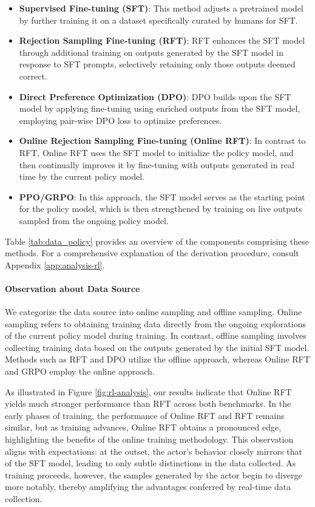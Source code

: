 \begin{itemize}[topsep=0pt]
\begin{itemize}[topsep=0pt]
\begin{itemize}
    \item \textbf{Supervised Fine-tuning (SFT)}: This method adjusts a pretrained model by further training it on a dataset specifically curated by humans for SFT.
    \item \textbf{Rejection Sampling Fine-tuning (RFT)}: RFT enhances the SFT model through additional training on outputs generated by the SFT model in response to SFT prompts, selectively retaining only those outputs deemed correct.
    \item \textbf{Direct Preference Optimization (DPO)}: DPO builds upon the SFT model by applying fine-tuning using enriched outputs from the SFT model, employing pair-wise DPO loss to optimize preferences.
    \item \textbf{Online Rejection Sampling Fine-tuning (Online RFT)}: In contrast to RFT, Online RFT uses the SFT model to initialize the policy model, and then continually improves it by fine-tuning with outputs generated in real time by the current policy model.
    \item \textbf{PPO/GRPO}: In this approach, the SFT model serves as the starting point for the policy model, which is then strengthened by training on live outputs sampled from the ongoing policy model.
\end{itemize}

Table \ref{tab:data_policy} provides an overview of the components comprising these methods. For a comprehensive explanation of the derivation procedure, consult Appendix \ref{app:analysis-rl}.

\paragraph{Observation about Data Source} We categorize the data source into online sampling and offline sampling. Online sampling refers to obtaining training data directly from the ongoing explorations of the current policy model during training. In contrast, offline sampling involves collecting training data based on the outputs generated by the initial SFT model. Methods such as RFT and DPO utilize the offline approach, whereas Online RFT and GRPO employ the online approach.

As illustrated in Figure \ref{fig:rl-analysis}, our results indicate that Online RFT yields much stronger performance than RFT across both benchmarks. In the early phases of training, the performance of Online RFT and RFT remains similar, but as training advances, Online RFT obtains a pronounced edge, highlighting the benefits of the online training methodology. This observation aligns with expectations: at the outset, the actor’s behavior closely mirrors that of the SFT model, leading to only subtle distinctions in the data collected. As training proceeds, however, the samples generated by the actor begin to diverge more notably, thereby amplifying the advantages conferred by real-time data collection.


\end{itemize}
\end{itemize}
